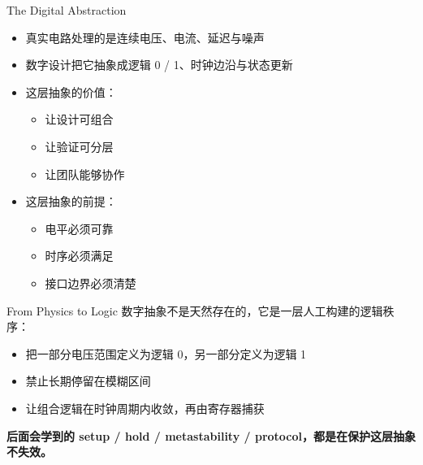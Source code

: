 \documentclass[aspectratio=169]{beamer}
\begin{document}
\begin{frame}{The Digital Abstraction}
\begin{itemize}
  \item 真实电路处理的是连续电压、电流、延迟与噪声
  \item 数字设计把它抽象成逻辑 0 / 1、时钟边沿与状态更新
  \item 这层抽象的价值：
  \begin{itemize}
    \item 让设计可组合
    \item 让验证可分层
    \item 让团队能够协作
  \end{itemize}
  \item 这层抽象的前提：
  \begin{itemize}
    \item 电平必须可靠
    \item 时序必须满足
    \item 接口边界必须清楚
  \end{itemize}
\end{itemize}
\end{frame}

\begin{frame}{From Physics to Logic}
\small
数字抽象不是天然存在的，它是一层人工构建的逻辑秩序：

\vspace{0.5em}
\begin{itemize}
  \item 把一部分电压范围定义为逻辑 0，另一部分定义为逻辑 1
  \item 禁止长期停留在模糊区间
  \item 让组合逻辑在时钟周期内收敛，再由寄存器捕获
\end{itemize}

\vspace{0.7em}
\textbf{后面会学到的 setup / hold / metastability / protocol，都是在保护这层抽象不失效。}
\end{frame}
\end{document}
